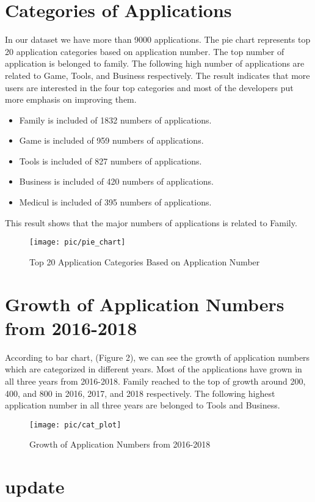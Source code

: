 \documentclass{article}
\begin{document}
\section*{Categories of Applications}
In our dataset we have more than 9000 applications. The pie chart represents top 20 application categories based on application number. The top number of application is belonged to family. The following high number of applications are related to Game, Tools, and Business respectively. The result indicates that more users are interested in the four top categories and most of the developers put more emphasis on improving them.
\begin{itemize}
\item
  Family is included of 1832  numbers of applications.
\item
  Game is included of 959  numbers of applications.
  \item
  Tools is included of 827  numbers of applications.
\item
  Business is included of 420  numbers of applications.
\item
  Medicul is included of 395  numbers of applications.
\end{itemize}

This result shows that the major numbers of applications is related to Family.
\begin{figure}
\centering
\texttt{[image: pic/pie\_chart]}
\caption{Top 20 Application Categories Based on Application Number}
\label{fig:1}
\end{figure}

\section*{Growth of Application Numbers from 2016-2018}
According to bar chart, (Figure 2), we can see the growth of application numbers which are categorized in different years. Most of the applications have grown in all three years from 2016-2018.
Family reached to the top of growth around 200, 400, and 800 in 2016, 2017, and 2018 respectively. The following highest application number in all three years are belonged to Tools and Business.

\begin{figure}
\centering
\texttt{[image: pic/cat\_plot]}
\caption{Growth of Application Numbers from 2016-2018} 
\label{fig:2}
\end{figure}	

\section*{update}
\end{document}
